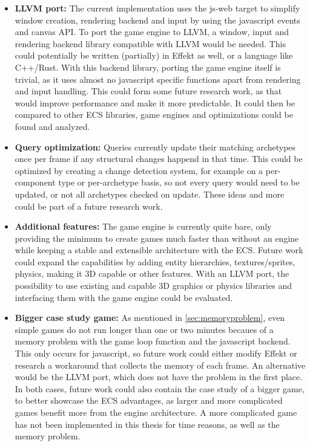 \begin{itemize}
\item[] \textbf{LLVM port:} The current implementation uses the \textsf{js-web} target to simplify window creation, rendering backend and input by using the javascript events and canvas API. To port the game engine to LLVM, a window, input and rendering backend library compatible with LLVM would be needed. This could potentially be written (partially) in Effekt as well, or a language like C++/Rust. With this backend library, porting the game engine itself is trivial, as it uses almost no javascript specific functions apart from rendering and input handling. This could form some future research work, as that would improve performance and make it more predictable. It could then be compared to other ECS libraries, game engines and optimizations could be found and analyzed.
\item[] \textbf{Query optimization:} Queries currently update their matching archetypes once per frame if any structural changes happend in that time. This could be optimized by creating a change detection system, for example on a per-component type or per-archetype basis, so not every query would need to be updated, or not all archetypes checked on update. These ideas and more could be part of a future research work.
\item[] \textbf{Additional features:} The game engine is currently quite bare, only providing the minimum to create games much faster than without an engine while keeping a stable and extensible architecture with the ECS. Future work could expand the capabilities by adding entity hierarchies, textures/sprites, physics, making it 3D capable or other features. With an LLVM port, the possibility to use existing and capable 3D graphics or physics libraries and interfacing them with the game engine could be evaluated.
\item[] \textbf{Bigger case study game:} As mentioned in \cref{sec:memoryproblem}, even simple games do not run longer than one or two minutes becaues of a memory problem with the game loop function and the javascript backend. This only occurs for javascript, so future work could either modify Effekt or research a workaround that collects the memory of each frame. An alternative would be the LLVM port, which does not have the problem in the first place. In both cases, future work could also contain the case study of a bigger game, to better showcase the ECS advantages, as larger and more complicated games benefit more from the engine architecture. A more complicated game has not been implemented in this thesis for time reasons, as well as the memory problem.
\end{itemize}
